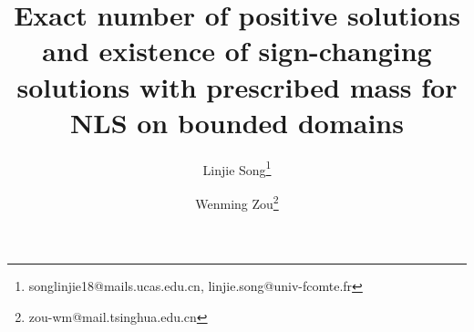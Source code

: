 \documentclass[10pt,a4paper]{article}
\theoremstyle{definition} \theoremstyle{remark}
\numberwithin{equation}{section}
\begin{document}
\title{Exact number of positive solutions and existence of sign-changing solutions with prescribed mass for NLS on bounded domains
}

\author{Linjie Song\footnote{songlinjie18@mails.ucas.edu.cn, linjie.song@univ-fcomte.fr}}  %

\author{Wenming Zou\footnote{zou-wm@mail.tsinghua.edu.cn}}


\date{}
	
\maketitle
\end{document}
